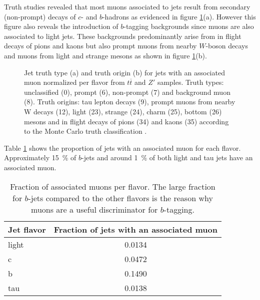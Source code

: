 Truth studies revealed that most muons associated to jets result from secondary (non-prompt) decays of $c$- and $b$-hadrons as evidenced in figure \ref{fig:muonTruth}(a). However this figure also reveals the introduction of $b$-tagging backgrounds since muons are also associated to light jets. These backgrounds predominantly arise from in flight decays of pions and kaons but also prompt muons from nearby $W$-boson decays and muons from light and strange mesons as shown in figure \ref{fig:muonTruth}(b).
\begin{figure}[]
  \centering
  \caption{ Jet truth type (a) and truth origin (b) for jets with an associated muon normalized per flavor from $t\overline{t}$ and $Z'$ samples. Truth types: unclassified (0), prompt (6), non-prompt (7) and background muon (8). Truth origins: tau lepton decays (9), prompt muons from nearby W decays (12), light (23), strange (24), charm (25), bottom (26) mesons and in flight decays of pions (34) and kaons (35) according to the Monte Carlo truth classification \citep{mctruthclassification}.}
  \label{fig:muonTruth}
\end{figure}
Table \ref{tab:MuonJetFlavors} shows the proportion of jets with an associated muon for each flavor. Approximately \qty{15}{\percent} of $b$-jets and around \qty{1}{\percent} of both light and tau jets have an associated muon.
\begin{table}[]
  \caption{Fraction of associated muons per flavor. The large fraction for $b$-jets compared to the other flavors is the reason why muons are a useful discriminator for $b$-tagging. }
  \label{tab:MuonJetFlavors}
  \centering
  \begin{tabular}{ l c }
    \hline
    Jet flavor & Fraction of jets with an associated muon \\
    \hline
    light      & 0.0134                                   \\
    c          & 0.0472                                   \\
    b          & 0.1490                                   \\
    tau        & 0.0138                                   \\
    \hline
  \end{tabular}
\end{table}
